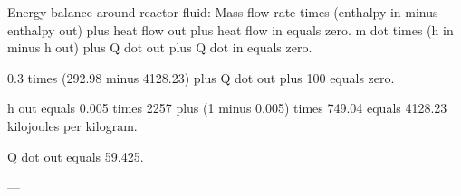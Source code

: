 Energy balance around reactor fluid:  
Mass flow rate times (enthalpy in minus enthalpy out) plus heat flow out plus heat flow in equals zero.  
m dot times (h in minus h out) plus Q dot out plus Q dot in equals zero.  

0.3 times (292.98 minus 4128.23) plus Q dot out plus 100 equals zero.  

h out equals 0.005 times 2257 plus (1 minus 0.005) times 749.04 equals 4128.23 kilojoules per kilogram.  

Q dot out equals 59.425.  

---